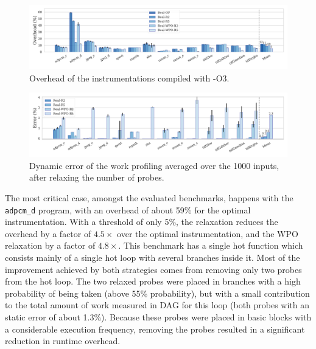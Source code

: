 \begin{figure}[t!]
    \centering
    \includegraphics[width=\textwidth]{figs/overhead-O3.pdf}
    \caption{Overhead of the instrumentations compiled with {\flagstype -O3}.}
    \label{fig:overhead-O3}
\end{figure}
\begin{figure}[t!]
    \centering
    \includegraphics[width=\textwidth]{figs/error-O3.pdf}
    \caption{Dynamic error of the work profiling averaged over the 1000 inputs, after relaxing the number of probes.}
    \label{fig:error-O3}
\end{figure}

The most critical case, amongst the evaluated benchmarks, happens with the
\texttt{adpcm\_d} program, with an overhead of about 59\% for the optimal
instrumentation.
With a threshold of only 5\%, the relaxation reduces
the overhead by a factor of $4.5\times$ over the optimal instrumentation,
and the WPO relaxation by a factor of $4.8\times$.
This benchmark has a single hot function
which consists mainly of a single hot loop with several branches inside it. %
Most of the improvement achieved by both strategies comes from removing only two probes from the hot loop. The two relaxed probes were
placed in branches with a high probability of being taken (above 55\% probability), but with a small contribution to the total amount of
work measured in DAG for this loop (both probes with an static error of about 1.3\%). Because these probes were placed in basic blocks with
a considerable execution frequency, removing the probes resulted in a significant reduction in runtime overhead.

